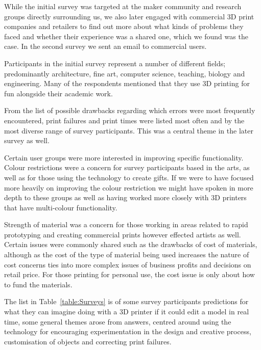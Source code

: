 \documentclass[pdftex, 11pt]{report} %
\begin{document}
While the initial survey was targeted at the maker community and research groups directly surrounding us, we also later engaged with commercial 3D print companies and retailers to find out more about what kinds of problems they faced and whether their experience was a shared one, which we found was the case. In the second survey we sent an email to commercial users. 

Participants in the initial survey represent a number of different fields; predominantly architecture, fine art, computer science, teaching, biology and engineering. Many of the respondents mentioned that they use 3D printing for fun alongside their academic work. 

From the list of possible drawbacks regarding which errors were most frequently encountered, print failures and print times were listed most often and by the most diverse range of survey participants. This was a central theme in the later survey as well.

Certain user groups were more interested in improving specific functionality. Colour restrictions were a concern for survey participants based in the arts, as well as for those using the technology to create gifts. If we were to have focused more heavily on improving the colour restriction we might have spoken in more depth to these groups as well as having worked more closely with 3D printers that have multi-colour functionality. 

Strength of material was a concern for those working in areas related to rapid prototyping and creating commercial prints however effected artists as well. Certain issues were commonly shared such as the drawbacks of cost of materials, although as the cost of the type of material being used increases the nature of cost concerns ties into more complex issues of business profits and decisions on retail price. For those printing for personal use, the cost issue is only about how to fund the materials. 

The list in Table~\ref{table:Surveys} is of some survey participants predictions for what they can imagine doing with a 3D printer if it could edit a model in real time, some general themes arose from answers, centred around using the technology for encouraging experimentation in the design and creative process, customisation of objects and correcting print failures.
\end{document}
